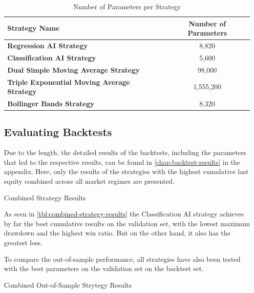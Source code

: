 \begin{table}[H]
    \centering
    \begin{tabular}{L{8cm}c}
        \toprule
        Strategy Name & Number of Parameters
        \\
        \midrule
        \textbf{Regression AI Strategy}                     & 8,820     \\
        \textbf{Classification AI Strategy}                 & 5,600     \\
        \textbf{Dual Simple Moving Average Strategy}        & 98,000    \\
        \textbf{Triple Exponential Moving Average Strategy} & 1,555,200 \\
        \textbf{Bollinger Bands Strategy}                   & 8,320     \\
        \bottomrule
    \end{tabular}
    \caption{Number of Parameters per Strategy}
    \label{tbl:parameters-number}
\end{table}

\subsection{Evaluating Backtests}

Due to the length, the detailed results of the backtests, including the parameters that led to the respective results, can be found in \autoref{chap:backtest-results} in the appendix.
Here, only the results of the strategies with the highest cumulative last equity combined across all market regimes are presented.

\begin{table}[H]
    
    \caption{Combined Strategy Results}
    \label{tbl:combined-strategy-results}
\end{table}

As seen in \autoref{tbl:combined-strategy-results} the Classification AI strategy achieves by far the best cumulative results on the validation set, with the lowest maximum drawdown and the highest win ratio.
But on the other hand, it also has the greatest loss.

To compare the out-of-sample performance, all strategies have also been tested with the best parameters on the validation set on the backtest set.

\begin{table}[H]
    
    \caption{Combined Out-of-Sample Strytegy Results}
    \label{tbl:combined-strategy-results-oof}
\end{table}



